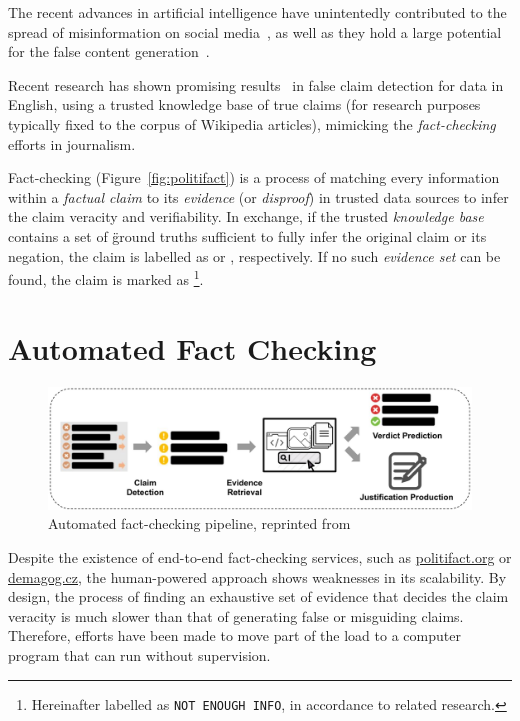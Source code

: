 The recent advances in artificial intelligence have unintentedly contributed to the spread of misinformation on social media~\cite{doi:10.1177/2056305119888654}, as well as they hold a large potential for the false content generation~\cite{glorin}.

Recent research has shown promising results~\cite{fever2} in false claim detection for data in English, using a trusted knowledge base of true claims (for research purposes typically fixed to the corpus of \textsf{Wikipedia} articles), mimicking the \textit{fact-checking} efforts in journalism.

Fact-checking (Figure~\ref{fig:politifact}) is a process of matching every information within a \textit{factual claim} to its \textit{evidence} (or \textit{disproof}) in trusted data sources to infer the claim veracity and verifiability. In exchange, if the trusted \textit{knowledge base} contains a set of \"{ground truths} sufficient to fully infer the original claim or its negation, the claim is labelled as {} or {}, respectively. If no such \textit{evidence set} can be found, the claim is marked as {}\footnote{Hereinafter labelled as \texttt{NOT ENOUGH INFO}, in accordance to related research.}.


\section{Automated Fact Checking}

\begin{figure}
    \includegraphics[width=14cm]{fig/framework.pdf}
    \caption{Automated fact-checking pipeline, reprinted from~\cite{guo-etal-2022-survey}}
    \label{fig:framework}
\end{figure}

Despite the existence of end-to-end fact-checking services, such as \url{politifact.org} or \url{demagog.cz}, the human-powered approach shows weaknesses in its scalability. By design, the process of finding an exhaustive set of evidence that decides the claim veracity is much slower than that of generating false or misguiding claims. Therefore, efforts have been made to move part of the load to a computer program that can run without supervision.

